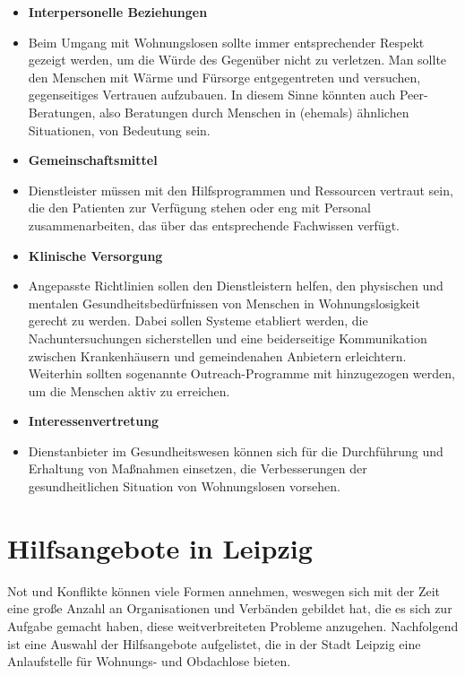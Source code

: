 \begin{itemize}
	\item \textbf{Interpersonelle Beziehungen}
	\item[] Beim Umgang mit Wohnungslosen sollte immer entsprechender Respekt gezeigt werden, um die Würde des Gegenüber nicht zu verletzen. Man sollte den Menschen mit Wärme und Fürsorge entgegentreten und versuchen, gegenseitiges Vertrauen aufzubauen. In diesem Sinne könnten auch Peer-Beratungen, also Beratungen durch Menschen in (ehemals) ähnlichen Situationen, von Bedeutung sein.
	\item \textbf{Gemeinschaftsmittel}
	\item[] Dienstleister müssen mit den Hilfsprogrammen und Ressourcen vertraut sein, die den Patienten zur Verfügung stehen oder eng mit Personal zusammenarbeiten, das über das entsprechende Fachwissen verfügt.
	\item \textbf{Klinische Versorgung}
	\item[] Angepasste Richtlinien sollen den Dienstleistern helfen, den physischen und mentalen Gesundheitsbedürfnissen von Menschen in Wohnungslosigkeit gerecht zu werden. Dabei sollen Systeme etabliert werden, die Nachuntersuchungen sicherstellen und eine beiderseitige Kommunikation zwischen Krankenhäusern und gemeindenahen Anbietern erleichtern. Weiterhin sollten sogenannte Outreach-Programme mit hinzugezogen werden, um die Menschen aktiv zu erreichen.
	\item \textbf{Interessenvertretung}
	\item[] Dienstanbieter im Gesundheitswesen können sich für die Durchführung und Erhaltung von Maßnahmen einsetzen, die Verbesserungen der gesundheitlichen Situation von Wohnungslosen vorsehen.
\end{itemize}


\section{Hilfsangebote in Leipzig}\label{sec:charities}

Not und Konflikte können viele Formen annehmen, weswegen sich mit der Zeit eine große Anzahl an Organisationen und Verbänden gebildet hat, die es sich zur Aufgabe gemacht haben, diese weitverbreiteten Probleme anzugehen. Nachfolgend ist eine Auswahl der Hilfsangebote aufgelistet, die in der Stadt Leipzig eine Anlaufstelle für Wohnungs- und Obdachlose bieten.


